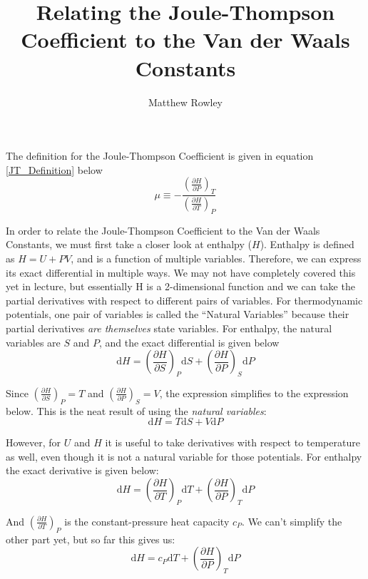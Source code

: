 \documentclass[12pt,letterpaper]{article}
\title{Relating the Joule-Thompson Coefficient to the Van der Waals Constants}
\author{Matthew Rowley}
\begin{document}
	\maketitle
	The definition for the Joule-Thompson Coefficient is given in equation \ref{JT_Definition} below
	\begin{equation}\label{JT_Definition}
		\mu\equiv-\frac{\left(\frac{\partial H}{\partial P}\right)_T}{\left(\frac{\partial H}{\partial T}\right)_P}
	\end{equation}

	In order to relate the Joule-Thompson Coefficient to the Van der Waals Constants, we must first take a closer look at enthalpy ($H$). Enthalpy is defined as $H=U+PV$, and is a function of multiple variables. Therefore, we can express its exact differential in multiple ways. We may not have completely covered this yet in lecture, but essentially H is a 2-dimensional function and we can take the partial derivatives with respect to different pairs of variables. For thermodynamic potentials, one pair of variables is called the ``Natural Variables'' because their partial derivatives \emph{are themselves} state variables. For enthalpy, the natural variables are $S$ and $P$, and the exact differential is given below
	\begin{equation}
		\mathrm{d}H=\left(\frac{\partial H}{\partial S}\right)_P\mathrm{d}S + \left(\frac{\partial H}{\partial P}\right)_S\mathrm{d}P
	\end{equation}

	Since $\left(\frac{\partial H}{\partial S}\right)_P=T$ and $\left(\frac{\partial H}{\partial P}\right)_S=V$, the expression simplifies to the expression below. This is the neat result of using the \emph{natural variables}:
	\begin{equation}\label{natural}
		\mathrm{d}H=T\mathrm{d}S + V\mathrm{d}P
	\end{equation}

	However, for $U$ and $H$ it is useful to take derivatives with respect to temperature as well, even though it is not a natural variable for those potentials. For enthalpy the exact derivative is given below:
	\begin{equation}
		\mathrm{d}H=\left(\frac{\partial H}{\partial T}\right)_P\mathrm{d}T + \left(\frac{\partial H}{\partial P}\right)_T\mathrm{d}P
	\end{equation}

	And $\left(\frac{\partial H}{\partial T}\right)_P$ is the constant-pressure heat capacity $c_P$. We can't simplify the other part yet, but so far this gives us:
	\begin{equation}\label{unnatural}
		\mathrm{d}H=c_P\mathrm{d}T + \left(\frac{\partial H}{\partial P}\right)_T\mathrm{d}P
	\end{equation}
\end{document}
